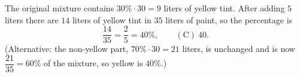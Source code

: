 The original mixture contains $30\%\cdot30=9$ liters of yellow tint. After adding $5$ liters there are $14$ liters of yellow tint in $35$ liters of paint, so the percentage is
\[
\dfrac{14}{35}=\dfrac{2}{5}=40\%,\qquad\mathrm{(C)}\ \boxed{40}.
\]
(Alternative: the non-yellow part, $70\%\cdot30=21$ liters, is unchanged and is now $\dfrac{21}{35}=60\%$ of the mixture, so yellow is $40\%$.)
